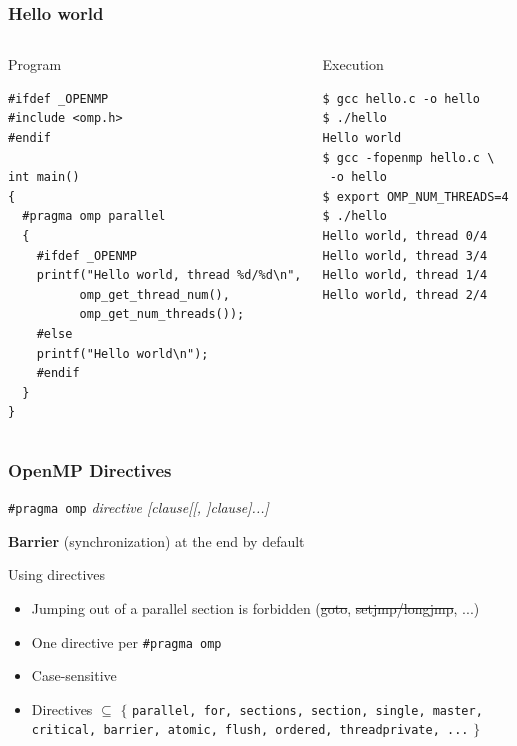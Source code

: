 \documentclass{beamer}
\begin{document}
\begin{frame}[fragile=singleslide]
  \frametitle{Hello world}

\small

\begin{columns}[t]
  \column{6cm}
  
\begin{block}{Program}
\begin{verbatim}
#ifdef _OPENMP
#include <omp.h>
#endif

int main()
{
  #pragma omp parallel 
  {
    #ifdef _OPENMP
    printf("Hello world, thread %d/%d\n",
          omp_get_thread_num(),
          omp_get_num_threads());
    #else 
    printf("Hello world\n");    
    #endif
  }
}
\end{verbatim}
\end{block}

\column{4cm}

\begin{block}{Execution}
\scriptsize
\begin{verbatim} 
$ gcc hello.c -o hello
$ ./hello
Hello world
$ gcc -fopenmp hello.c \
 -o hello
$ export OMP_NUM_THREADS=4
$ ./hello
Hello world, thread 0/4
Hello world, thread 3/4
Hello world, thread 1/4
Hello world, thread 2/4
\end{verbatim}
\end{block}  
\end{columns}

\end{frame}



\begin{frame}
  \frametitle{OpenMP Directives}

\begin{framed}
  {\tt \#pragma omp} {\it directive [clause[[, ]clause]...]}   
\end{framed}
 
\textbf{Barrier} (synchronization) at the end by default 

\medskip

\begin{block}{Using directives}
\begin{itemize}
\item Jumping out of a parallel section is forbidden (\sout{goto}, \sout{setjmp/longjmp}, ...)
\item One directive per \texttt{\#pragma omp}
\item Case-sensitive

\item Directives $\subseteq$ $\{$ {\tt parallel, for, sections, section, single, master, critical,
  barrier, atomic, flush, ordered, threadprivate, ...} $\}$
\end{itemize}
\end{block}

\end{frame}
\end{document}
